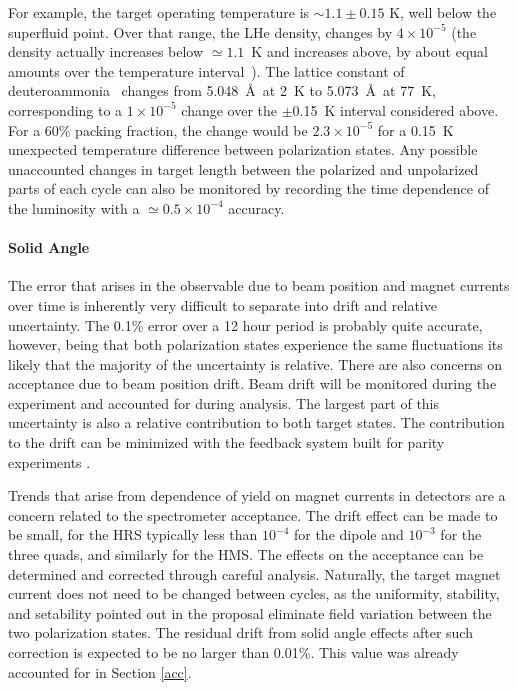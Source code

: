For example, the target operating temperature is $\sim 1.1\pm 0.15$ K, well below the 
superfluid point.  Over that range, the LHe density, changes by $4\times
10^{-5}$ (the density actually increases below $\simeq 1.1$~K
and increases above, by about equal amounts over the temperature 
interval~\cite{lhe}).
The lattice constant of deuteroammonia~\cite{nd3} changes from 5.048~\AA\ at 2~K to 5.073~\AA\ at 77~K, corresponding to a $1\times 10^{-5}$ change over the 
$\pm$0.15~K interval considered above.  For a 60\% packing fraction, the change 
would be $2.3\times10^{-5}$ for a 0.15~K unexpected temperature difference between
polarization states.
Any possible unaccounted changes in target length between the polarized and 
unpolarized parts of each cycle can also be monitored by recording the time 
dependence of the luminosity with a $\simeq 0.5\times 10^{-4}$ accuracy. %

\paragraph{ Solid Angle }\mbox{}

The error that arises in the observable due to beam position and magnet currents
over time is inherently very difficult to separate into drift and relative uncertainty.
The 0.1\% error over a 12 hour period is probably quite accurate, however, being
that both polarization states experience the same fluctuations its likely that the majority
of the uncertainty is relative.  There are also concerns on acceptance due to beam position drift. Beam drift
will be monitored during the experiment and accounted for during analysis.  The largest part of this
uncertainty is also a relative contribution to both target states.  The contribution to the drift can be minimized
with the feedback system built for parity experiments
.

Trends that arise from dependence of yield on
magnet currents in detectors are a concern related to the spectrometer acceptance.  The drift
effect can be made to be small, for the HRS typically less than $10^{-4}$ for the dipole
and $10^{-3}$ for the three quads, and similarly for the HMS.  The effects on the acceptance can be determined and
corrected through careful analysis.  Naturally, the
target magnet current does not need to be changed between cycles, as the uniformity, stability, and setability
pointed out in the proposal eliminate field variation between the two polarization
states.  The residual drift from solid angle effects after such correction is expected to be no larger than 0.01\%.
This value was already accounted for in Section \ref{acc}.


